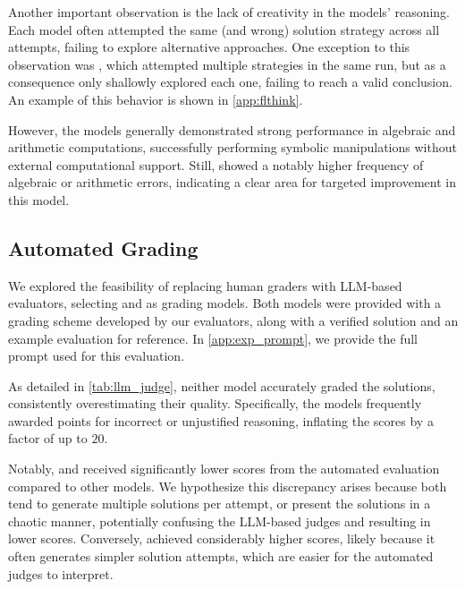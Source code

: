 Another important observation is the lack of creativity in the models' reasoning. Each model often attempted the same (and wrong) solution strategy across all attempts, failing to explore alternative approaches. One exception to this observation was \flthink{}, which attempted multiple strategies in the same run, but as a consequence only shallowly explored each one, failing to reach a valid conclusion. An example of this behavior is shown in \cref{app:flthink}.


However, the models generally demonstrated strong performance in algebraic and arithmetic computations, successfully performing symbolic manipulations without external computational support. Still, \rone{} showed a notably higher frequency of algebraic or arithmetic errors, indicating a clear area for targeted improvement in this model.

\subsection{Automated Grading}\label{subsec:automated}

We explored the feasibility of replacing human graders with LLM-based evaluators, selecting \othree{} and \claude{} as grading models. Both models were provided with a grading scheme developed by our evaluators, along with a verified solution and an example evaluation for reference. In \cref{app:exp_prompt}, we provide the full prompt used for this evaluation.

As detailed in \cref{tab:llm_judge}, neither model accurately graded the solutions, consistently overestimating their quality. Specifically, the models frequently awarded points for incorrect or unjustified reasoning, inflating the scores by a factor of up to $20$.

Notably, \flthink{} and \grok{} received significantly lower scores from the automated evaluation compared to other models. We hypothesize this discrepancy arises because both tend to generate multiple solutions per attempt, or present the solutions in a chaotic manner, potentially confusing the LLM-based judges and resulting in lower scores. Conversely, \qwq{} achieved considerably higher scores, likely because it often generates simpler solution attempts, which are easier for the automated judges to interpret.

